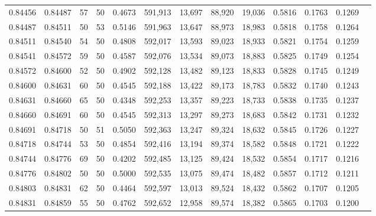 \begin{tabular}{rrrrrrrrrrrrr}
0.84456 & 0.84487 &    57 &  50 &                                     0.4673 & 591,913 &  13,697 &  88,920 &  19,036 & 0.5816 & 0.1763 & 0.1269 \\
0.84487 & 0.84511 &    50 &  53 &                                     0.5146 & 591,963 &  13,647 &  88,973 &  18,983 & 0.5818 & 0.1758 & 0.1264 \\
0.84511 & 0.84540 &    54 &  50 &                                     0.4808 & 592,017 &  13,593 &  89,023 &  18,933 & 0.5821 & 0.1754 & 0.1259 \\
0.84541 & 0.84572 &    59 &  50 &                                     0.4587 & 592,076 &  13,534 &  89,073 &  18,883 & 0.5825 & 0.1749 & 0.1254 \\
0.84572 & 0.84600 &    52 &  50 &                                     0.4902 & 592,128 &  13,482 &  89,123 &  18,833 & 0.5828 & 0.1745 & 0.1249 \\
0.84600 & 0.84631 &    60 &  50 &                                     0.4545 & 592,188 &  13,422 &  89,173 &  18,783 & 0.5832 & 0.1740 & 0.1243 \\
0.84631 & 0.84660 &    65 &  50 &                                     0.4348 & 592,253 &  13,357 &  89,223 &  18,733 & 0.5838 & 0.1735 & 0.1237 \\
0.84660 & 0.84691 &    60 &  50 &                                     0.4545 & 592,313 &  13,297 &  89,273 &  18,683 & 0.5842 & 0.1731 & 0.1232 \\
0.84691 & 0.84718 &    50 &  51 &                                     0.5050 & 592,363 &  13,247 &  89,324 &  18,632 & 0.5845 & 0.1726 & 0.1227 \\
0.84718 & 0.84744 &    53 &  50 &                                     0.4854 & 592,416 &  13,194 &  89,374 &  18,582 & 0.5848 & 0.1721 & 0.1222 \\
0.84744 & 0.84776 &    69 &  50 &                                     0.4202 & 592,485 &  13,125 &  89,424 &  18,532 & 0.5854 & 0.1717 & 0.1216 \\
0.84776 & 0.84802 &    50 &  50 &                                     0.5000 & 592,535 &  13,075 &  89,474 &  18,482 & 0.5857 & 0.1712 & 0.1211 \\
0.84803 & 0.84831 &    62 &  50 &                                     0.4464 & 592,597 &  13,013 &  89,524 &  18,432 & 0.5862 & 0.1707 & 0.1205 \\
0.84831 & 0.84859 &    55 &  50 &                                     0.4762 & 592,652 &  12,958 &  89,574 &  18,382 & 0.5865 & 0.1703 & 0.1200 \\

\end{tabular}

